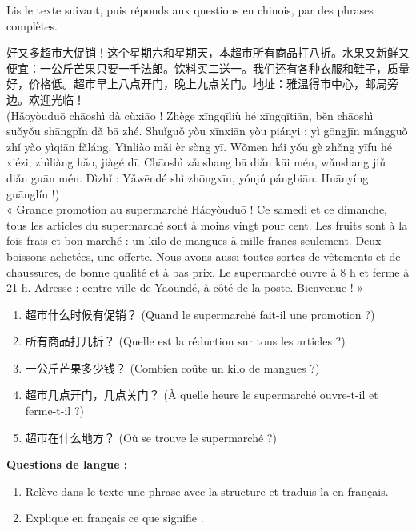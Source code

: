 \documentclass[11pt]{article}
\newcommand{\zh}[1]{\ifmmode\text{#1}\else{#1}\fi}
\begin{document}
\begin{exercice}
Lis le texte suivant, puis réponds aux questions en chinois, par des phrases complètes.

\begin{textebox}
好又多超市大促销！这个星期六和星期天，本超市所有商品打八折。水果又新鲜又便宜：一公斤芒果只要一千法郎。饮料买二送一。我们还有各种衣服和鞋子，质量好，价格低。超市早上八点开门，晚上九点关门。地址：雅温得市中心，邮局旁边。欢迎光临！\\
(Hǎoyòuduō chāoshì dà cùxiāo ! Zhège xīngqīliù hé xīngqītiān, běn chāoshì suǒyǒu shāngpǐn dǎ bā zhé. Shuǐguǒ yòu xīnxiān yòu piányi : yì gōngjīn mángguǒ zhǐ yào yìqiān fǎláng. Yǐnliào mǎi èr sòng yī. Wǒmen hái yǒu gè zhǒng yīfu hé xiézi, zhìliàng hǎo, jiàgé dī. Chāoshì zǎoshang bā diǎn kāi mén, wǎnshang jiǔ diǎn guān mén. Dìzhǐ : Yǎwēndé shì zhōngxīn, yóujú pángbiān. Huānyíng guānglín !)\\
« Grande promotion au supermarché Hǎoyòuduō ! Ce samedi et ce dimanche, tous les articles du supermarché sont à moins vingt pour cent. Les fruits sont à la fois frais et bon marché : un kilo de mangues à mille francs seulement. Deux boissons achetées, une offerte. Nous avons aussi toutes sortes de vêtements et de chaussures, de bonne qualité et à bas prix. Le supermarché ouvre à 8 h et ferme à 21 h. Adresse : centre-ville de Yaoundé, à côté de la poste. Bienvenue ! »
\end{textebox}

\begin{enumerate}
\item 超市什么时候有促销？ (Quand le supermarché fait-il une promotion ?)
\item 所有商品打几折？ (Quelle est la réduction sur tous les articles ?)
\item 一公斤芒果多少钱？ (Combien coûte un kilo de mangues ?)
\item 超市几点开门，几点关门？ (À quelle heure le supermarché ouvre-t-il et ferme-t-il ?)
\item 超市在什么地方？ (Où se trouve le supermarché ?)
\end{enumerate}
\textbf{Questions de langue :}
\begin{enumerate}
\item Relève dans le texte une phrase avec la structure \zh{又……又……} et traduis-la en français.
\item Explique en français ce que signifie \zh{买二送一}.
\end{enumerate}
\end{exercice}
\end{document}
